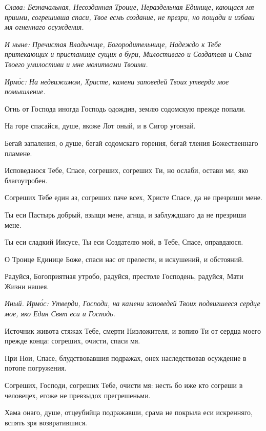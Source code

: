 \itshape Слава\normalfont{}: Безначальная, Несозданная Троице, Нераздельная Единице, кающася мя приими, согрешивша спаси, Твое есмь создание, не презри, но пощади и избави мя огненнаго осуждения.

\itshape И ныне\normalfont{}: Пречистая Владычице, Богородительнице, Надеждо к Тебе притекающих и пристанище сущих в бури, Милостиваго и Создателя и Сына Твоего умилостиви и мне молитвами Твоими. 


\itshape Ирм\'{о}с\normalfont{}: На недвижимом, Христе, камени заповедей Твоих утверди мое помышление.

Огнь от Господа иногда Господь одождив, землю содомскую прежде попали.

На горе спасайся, душе, якоже Лот оный, и в Сигор угонзай.

Бегай запаления, о душе, бегай содомскаго горения, бегай тления Божественнаго пламене.

Исповедаюся Тебе, Спасе, согреших, согреших Ти, но ослаби, остави ми, яко благоутробен.

Согреших Тебе един аз, согреших паче всех, Христе Спасе, да не презриши мене.

Ты еси Пастырь добрый, взыщи мене, агнца, и заблуждшаго да не презриши мене.

Ты еси сладкий Иисусе, Ты еси Создателю мой, в Тебе, Спасе, оправдаюся.


О Троице Единице Боже, спаси нас от прелести, и искушений, и обстояний.


Радуйся, Богоприятная утробо, радуйся, престоле Господень, радуйся, Мати Жизни нашея.

\itshape Иный. Ирм\'{о}с\normalfont{}: Утверди, Господи, на камени заповедей Твоих подвигшееся сердце мое, яко Един Свят еси и Господь.

Источник живота стяжах Тебе, смерти Низложителя, и вопию Ти от сердца моего прежде конца: согреших, очисти, спаси мя.

При Нои, Спасе, блудствовавшия подражах, онех наследствовав осуждение в потопе погружения.

Согреших, Господи, согреших Тебе, очисти мя: несть бо иже кто согреши в человецех, егоже не превзыдох прегрешеньми.

Хама онаго, душе, отцеубийца подражавши, срама не покрыла еси искренняго, вспять зря возвратившися.


